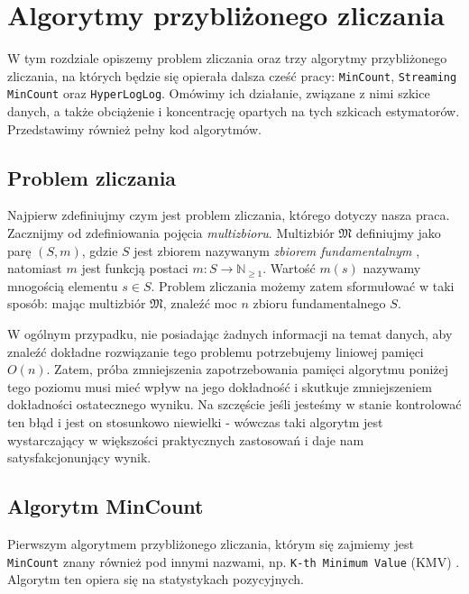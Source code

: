 \chapter{Algorytmy przybliżonego zliczania}
\thispagestyle{chapterBeginStyle}
\label{rozdzial1}

W tym rozdziale  opiszemy problem zliczania oraz trzy  algorytmy przybliżonego zliczania, na których będzie się opierała dalsza cześć pracy:  \texttt{MinCount},  \texttt{Streaming MinCount} oraz \texttt{HyperLogLog}. Omówimy ich działanie, związane z nimi szkice danych, a także obciążenie i koncentrację opartych na tych szkicach estymatorów. Przedstawimy również pełny kod algorytmów. 


\section{Problem zliczania}
Najpierw zdefiniujmy czym jest problem zliczania, którego dotyczy nasza praca.
Zacznijmy od zdefiniowania pojęcia \textit{multizbioru}. Multizbiór $\mathfrak{M}$ definiujmy jako parę $(S, m)$, gdzie $S$ jest zbiorem nazywanym \textit{zbiorem fundamentalnym} , natomiast $m$ jest funkcją postaci $m : S \rightarrow \mathbb{N}_{\geq 1}$. Wartość $m(s)$ nazywamy mnogością elementu $s \in S$. Problem zliczania możemy zatem sformułować w taki sposób: mając multizbiór $\mathfrak{M}$, znaleźć moc $n$ zbioru fundamentalnego $S$.

W ogólnym przypadku, nie posiadając żadnych informacji na temat danych, aby znaleźć dokładne rozwiązanie tego problemu potrzebujemy liniowej pamięci $O(n)$. Zatem, próba zmniejszenia zapotrzebowania pamięci algorytmu poniżej tego poziomu musi mieć wpływ na jego dokładność i skutkuje zmniejszeniem dokładności ostatecznego wyniku. Na szczęście jeśli jesteśmy w stanie kontrolować ten błąd i jest on stosunkowo niewielki - wówczas taki algorytm jest wystarczający w większości praktycznych zastosowań i daje nam satysfakcjonunjący wynik.


\section{Algorytm MinCount}

Pierwszym algorytmem przybliżonego zliczania, którym się zajmiemy jest \texttt{MinCount} znany również pod innymi nazwami, np.  \texttt{K-th Minimum Value} (KMV) \cite{kmv}. Algorytm ten opiera się na statystykach pozycyjnych.


